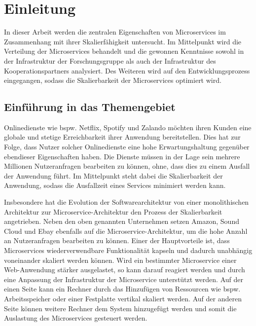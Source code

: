 \chapter{Einleitung}
\label{cha:einleitung}

In dieser Arbeit werden die zentralen Eigenschaften von Microservices im Zusammenhang mit ihrer Skalierfähigkeit untersucht.
Im Mittelpunkt wird die Verteilung der Microservices behandelt und die gewonnen Kenntnisse sowohl in der Infrastruktur der Forschungsgruppe als auch der Infrastruktur des Kooperationspartners analysiert.
Des Weiteren wird auf den Entwicklungsprozess eingegangen, sodass die Skalierbarkeit der Microservices optimiert wird.

\section{Einführung in das Themengebiet}


Onlinedienste wie bspw. Netflix, Spotify und Zalando möchten ihren Kunden eine globale und stetige Erreichbarkeit ihrer Anwendung bereitstellen.
Dies hat zur Folge, dass Nutzer solcher Onlinedienste eine hohe Erwartungshaltung gegenüber ebendieser Eigenschaften haben.
Die Dienste müssen in der Lage sein mehrere Millionen Nutzeranfragen bearbeiten zu können, ohne, dass dies zu einem Ausfall der Anwendung führt.
Im Mittelpunkt steht dabei die Skalierbarkeit der Anwendung, sodass die Ausfallzeit eines Services minimiert werden kann.

Insbesondere hat die Evolution der Softwarearchitektur von einer monolithischen Architektur zur Microservice-Architektur den Prozess der Skalierbarkeit angetrieben.
Neben den oben genannten Unternehmen setzen Amazon, Sound Cloud und Ebay ebenfalls auf die Microservice-Architektur, um die hohe Anzahl an Nutzeranfragen bearbeiten zu können.
Einer der Hauptvorteile ist, dass Microservices wiederverwendbare Funktionalität kapseln und dadurch unabhängig voneinander skaliert werden können.
Wird ein bestimmter Microservice einer Web-Anwendung stärker ausgelastet, so kann darauf reagiert werden und durch eine Anpassung der Infrastruktur der Microservice unterstützt werden.
Auf der einen Seite kann ein Rechner durch das Hinzufügen von Ressourcen wie bspw. Arbeitsspeicher oder einer Festplatte vertikal skaliert werden.
Auf der anderen Seite können weitere Rechner dem System hinzugefügt werden und somit die Auslastung des Microservices gesteuert werden.

